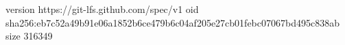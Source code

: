 version https://git-lfs.github.com/spec/v1
oid sha256:eb7c52a49b91e06a1852b6ce479b6c04af205e27cb01febc07067bd495c838ab
size 316349
